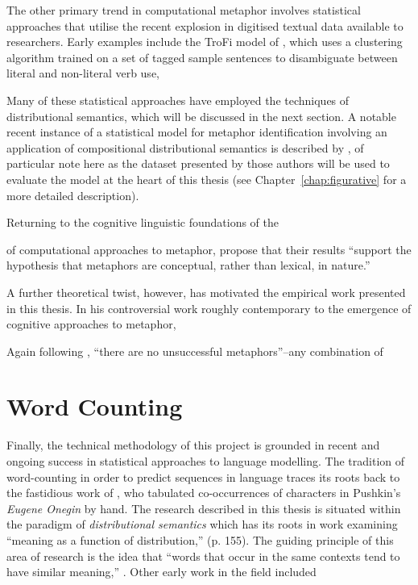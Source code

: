 The other primary trend in computational metaphor involves statistical approaches that utilise the recent explosion in digitised textual data available to researchers.  Early examples include the TroFi model of \cite{BirkeEA2006}, which uses a clustering algorithm trained on a set of tagged sample sentences to disambiguate between literal and non-literal verb use, 

Many of these statistical approaches \cite{TurneyEA2011} have employed the techniques of distributional semantics, which will be discussed in the next section.  A notable recent instance of a statistical model for metaphor identification involving an application of compositional distributional semantics is described by \cite{GutierrezEA2016}, of particular note here as the dataset presented by those authors will be used to evaluate the model at the heart of this thesis (see Chapter~\ref{chap:figurative} for a more detailed description).

Returning to the cognitive linguistic foundations of the

of computational approaches to metaphor, \citet[][p.~248]{TsvetkovEA2014} propose that their results ``support the hypothesis that metaphors are conceptual, rather than lexical, in nature.''

A further theoretical twist, however, has motivated the empirical work presented in this thesis.  In his controversial work roughly contemporary to the emergence of cognitive approaches to metaphor, \cite{Davidson1974}

Again following \cite{Davidson}, ``there are no unsuccessful metaphors''--any combination of 

\section{Word Counting}
Finally, the technical methodology of this project is grounded in recent and ongoing success in statistical approaches to language modelling.  The tradition of word-counting in order to predict sequences in language traces its roots back to the fastidious work of \cite{Markov}, who tabulated co-occurrences of characters in Pushkin's \emph{Eugene Onegin} by hand.  The research described in this thesis is situated within the paradigm of \emph{distributional semantics} which has its roots in  work examining ``meaning as a function of distribution,'' (p. 155).  The guiding principle of this area of research is the idea that ``words that occur in the same contexts tend to have similar meaning,'' \citep[][p. 126]{Pantel2005}.  Other early work in the field included 

